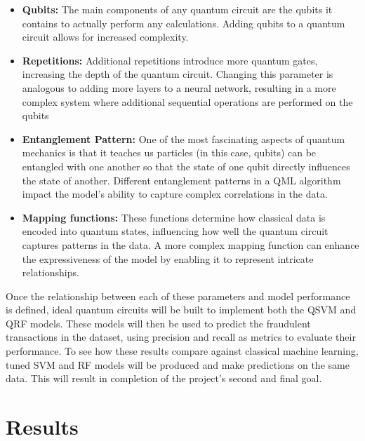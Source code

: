 \documentclass[11pt, oneside]{article}   	%
\begin{document}
\begin{itemize}
    \item \textbf{Qubits:} The main components of any quantum circuit are the qubits it contains to actually perform any calculations. Adding qubits to a quantum circuit allows for increased complexity.
    \item \textbf{Repetitions:} Additional repetitions introduce more quantum gates, increasing the depth of the quantum circuit. Changing this parameter is analogous to adding more layers to a neural network, resulting in a more complex system where additional sequential operations are performed on the qubits
    \item \textbf{Entanglement Pattern:} One of the most fascinating aspects of quantum mechanics is that it teaches us particles (in this case, qubits) can be entangled with one another so that the state of one qubit directly influences the state of another. Different entanglement patterns in a QML algorithm impact the model’s ability to capture complex correlations in the data.
    \item \textbf{Mapping functions:} These functions determine how classical data is encoded into quantum states, influencing how well the quantum circuit captures patterns in the data. A more complex mapping function can enhance the expressiveness of the model by enabling it to represent intricate relationships.
\end{itemize}

Once the relationship between each of these parameters and model performance is defined, ideal quantum circuits will be built to implement both the QSVM and QRF models. These models will then be used to predict the fraudulent transactions in the dataset, using precision and recall as metrics to evaluate their performance. To see how these results compare against classical machine learning, tuned SVM and RF models will be produced and make predictions on the same data. This will result in completion of the project's second and final goal. 



\section{Results}

\end{document}
